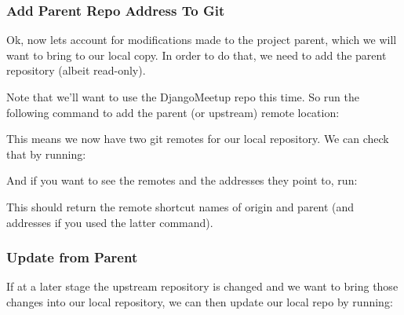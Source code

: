 \documentclass[letterpaper,10pt,english]{sphinxmanual}
\begin{document}
\subsubsection{Add Parent Repo Address To Git}
\label{\detokenize{guide/02_download-project:add-parent-repo-address-to-git}}
Ok, now lets account for modifications made to the project parent, which we will want to bring to our local copy.  In order to do that, we need to add the parent repository (albeit read-only).

Note that we’ll want to use the DjangoMeetup repo this time.  So run the following command to add the parent (or upstream) remote location:

\begin{sphinxVerbatim}[commandchars=\\\{\}]
 
    

 
    
\end{sphinxVerbatim}

This means we now have two git remotes for our local repository.  We can check that by running:

\begin{sphinxVerbatim}[commandchars=\\\{\}]
 
\end{sphinxVerbatim}

And if you want to see the remotes and the addresses they point to, run:

\begin{sphinxVerbatim}[commandchars=\\\{\}]
  
\end{sphinxVerbatim}

This should return the remote shortcut names of origin and parent (and addresses if you used the latter command).


\subsubsection{Update from Parent}
\label{\detokenize{guide/02_download-project:update-from-parent}}
If at a later stage the upstream repository is changed and we want to bring those changes into our local repository, we can then update our local repo by running:
\end{document}
